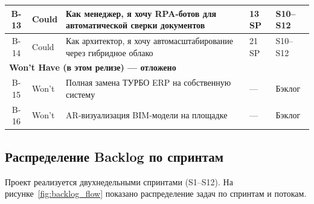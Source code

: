 \documentclass[12pt,a4paper]{article}
\begin{document}
\begin{table}[H]
\begin{tabularx}{\textwidth}{|c|l|X|l|l|}
\hline
B-13 & Could & Как менеджер, я хочу RPA-ботов для автоматической сверки документов & 13 SP & S10--S12 \\
\hline
B-14 & Could & Как архитектор, я хочу автомасштабирование через гибридное облако & 21 SP & S10--S12 \\
\hline
\multicolumn{5}{|l|}{\cellcolor{gray!10}\textbf{Won't Have (в этом релизе) --- отложено}} \\
\hline
B-15 & Won't & Полная замена ТУРБО ERP на собственную систему & --- & Бэклог \\
\hline
B-16 & Won't & AR-визуализация BIM-модели на площадке & --- & Бэклог \\
\hline
\end{tabularx}
\end{table}

\subsection{Распределение Backlog по спринтам}

Проект реализуется двухнедельными спринтами (S1--S12). На рисунке~\ref{fig:backlog_flow} показано распределение задач по спринтам и потокам.
\end{document}
